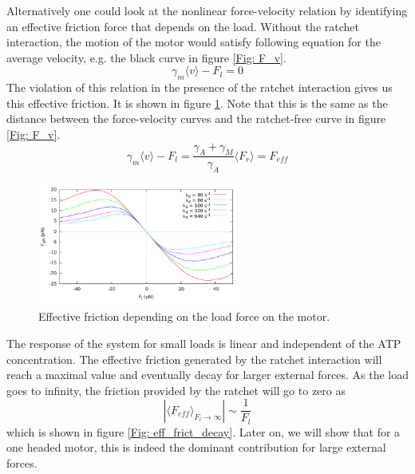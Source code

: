 \documentclass[aps,pre,onecolumn,showpacs,showkeys,a4paper]{revtex4}
\begin{document}
\par
Alternatively one could look at the nonlinear force-velocity relation by identifying an effective friction force that depends on the load. Without the ratchet interaction, the motion of the motor would satisfy following equation for the average velocity, e.g. the black curve in figure \ref{Fig: F_v}.
\begin{equation*}
\gamma_{m}\langle v\rangle - F_{l} = 0
\end{equation*}
The violation of this relation in the presence of the ratchet interaction gives us this effective friction. It is shown in figure \ref{Fig: effective_friction}. Note that this is the same as the distance between the force-velocity curves and the ratchet-free curve in figure \ref{Fig: F_v}.
\begin{equation*}
\gamma_{m}\langle v\rangle - F_{l} = \frac{\gamma_A + \gamma_M}{\gamma_A} \langle F_r \rangle = F_{eff}
\end{equation*}
\begin{figure}[h]
\centering
\includegraphics[width=0.6\textwidth,height=!]{effective_friction}
\caption{Effective friction depending on the load force on the motor.}
\label{Fig: effective_friction}
\end{figure}
The response of the system for small loads is linear and independent of the ATP concentration. The effective friction generated by the ratchet interaction will reach a maximal value and eventually decay for larger external forces. As the load goes to infinity, the friction provided by the ratchet will go to zero as 
\begin{equation*}
|\langle F_{eff}\rangle_{F_l\rightarrow\infty}| \sim \frac{1}{F_l}
\end{equation*} 
which is shown in figure \ref{Fig: eff_frict_decay}. Later on, we will show that for a one headed motor, this is indeed the dominant contribution for large external forces.  
\end{document}
